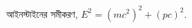 \documentclass[preview]{standalone}
\begin{document}
\begin{center}
আইনস্টাইনের সমীকরণ, $E^2=(mc^2)^2+(pc)^2$.
\end{center}
\end{document}
